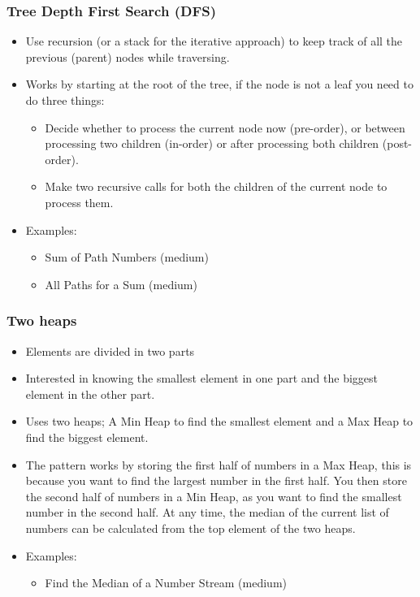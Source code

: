 \begin{frame}[fragile]
	\frametitle{Tree Depth First Search (DFS)}
		
			\begin{itemize}
			\item Use recursion (or a stack for the iterative approach) to keep track of all the previous (parent) nodes while traversing.
			\item Works by starting at the root of the tree, if the node is not a leaf you need to do three things:
			\begin{itemize}
			\item Decide whether to process the current node now (pre-order), or between processing two children (in-order) or after processing both children (post-order).
			\item Make two recursive calls for both the children of the current node to process them.
			\end{itemize}
			
				\item Examples:
			\begin{itemize}
				\item Sum of Path Numbers (medium)
				\item All Paths for a Sum (medium)
			\end{itemize}

			\end{itemize}	
\end{frame}

\begin{frame}[fragile]
	\frametitle{Two heaps}
		
			\begin{itemize}
			\item Elements are divided in two parts
			\item Interested in knowing the smallest element in one part and the biggest element in the other part.
			\item Uses two heaps; A Min Heap to find the smallest element and a Max Heap to find the biggest element. 
			\item The pattern works by storing the first half of numbers in a Max Heap, this is because you want to find the largest number in the first half. You then store the second half of numbers in a Min Heap, as you want to find the smallest number in the second half. At any time, the median of the current list of numbers can be calculated from the top element of the two heaps.
		
				\item Examples:
			\begin{itemize}
				\item Find the Median of a Number Stream (medium)
			\end{itemize}

			\end{itemize}	
\end{frame}

